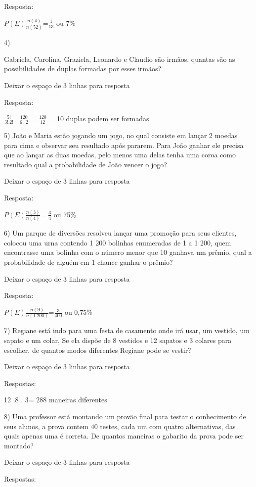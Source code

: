 {Resposta:

\(P(E)\frac{n(4)}{n(52)}\)=\(\frac{1}{13}\) ou 7\%

4)

Gabriela, Carolina, Graziela, Leonardo e Claudio são irmãos, quantas são
as possibilidades de duplas formadas por esses irmãos?

Deixar o espaço de 3 linhas para resposta

Resposta:

\(\frac{5!}{3!.2!}\)=\(\frac{120}{6\ .\ 2}\) = \(\frac{120}{12}\) = 10
duplas podem ser formadas

5) João e Maria estão jogando um jogo, no qual consiste em lançar 2
moedas para cima e observar seu resultado após pararem. Para João ganhar
ele precisa que ao lançar as duas moedas, pelo menos uma delas tenha uma
coroa como resultado qual a probabilidade de João vencer o jogo?

Deixar o espaço de 3 linhas para resposta

Resposta:

\(P(E)\frac{n(3)}{n(4)}\)= \(\frac{3}{4}\) ou 75\%

6) Um parque de diversões resolveu lançar uma promoção para seus
clientes, colocou uma urna contendo 1 200 bolinhas enumeradas de 1 a 1
200, quem encontrasse uma bolinha com o número menor que 10 ganhava um
prêmio, qual a probabilidade de alguém em 1 chance ganhar o prêmio?

Deixar o espaço de 3 linhas para resposta

Resposta:

\(P(E)\frac{n(9)}{n(1\ 200)}\)=\(\frac{3}{400}\) ou 0,75\%

7) Regiane está indo para uma festa de casamento onde irá usar, um
vestido, um sapato e um colar, Se ela dispõe de 8 vestidos e 12 sapatos
e 3 colares para escolher, de quantos modos diferentes Regiane pode se
vestir?

Deixar o espaço de 3 linhas para resposta

Respostas:

12 .8 . 3= 288 maneiras diferentes

8) Uma professor está montando um provão final para testar o
conhecimento de seus alunos, a prova contem 40 testes, cada um com
quatro alternativas, das quais apenas uma é correta. De quantos maneiras
o gabarito da prova pode ser montado?

Deixar o espaço de 3 linhas para resposta

Respostas:

}

